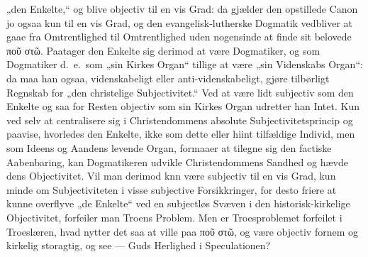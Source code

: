 „den Enkelte,“ og blive objectiv til en vis Grad: da gjælder den
opstillede
 Canon jo ogsaa kun til en vis Grad, og den
evangelisk-lutherske Dogmatik vedbliver at gaae fra Omtrentlighed
til Omtrentlighed uden nogensinde at finde sit belovede ποῦ στῶ.
Paatager den Enkelte sig derimod at være Dogmatiker, og som
Dogmatiker d.\ e.\ som „sin Kirkes Organ“ tillige at være „sin
Videnskabs Organ“: da maa han ogsaa, videnskabeligt eller
anti-videnskabeligt, gjøre tilbørligt Regnskab for „den christelige
Subjectivitet.“ Ved at være lidt subjectiv som den Enkelte og saa
for Resten objectiv som sin Kirkes Organ udretter han Intet. Kun
ved selv at centralisere sig i Christendommens absolute
Subjectivitetsprincip og paavise, hvorledes den Enkelte, ikke som
dette eller hiint tilfældige Individ, men som Ideens og Aandens
levende Organ, formaaer at tilegne sig den factiske Aabenbaring,
kan Dogmatikeren udvikle Christendommens Sandhed og hævde dens
Objectivitet. Vil man derimod knn være subjectiv til en vis Grad,
kun minde om Subjectiviteten i visse subjective Forsikkringer, for
desto friere at kunne overflyve „de Enkelte“ ved en subjectløs
Svæven i den historisk-kirkelige Objectivitet, forfeiler man
Troens Problem. Men er Troesproblemet forfeilet i Troeslæren, hvad
nytter det saa at ville paa ποῦ στῶ, og være objectiv fornem og
kirkelig storagtig, og see --- Guds Herlighed i Speculationen?

